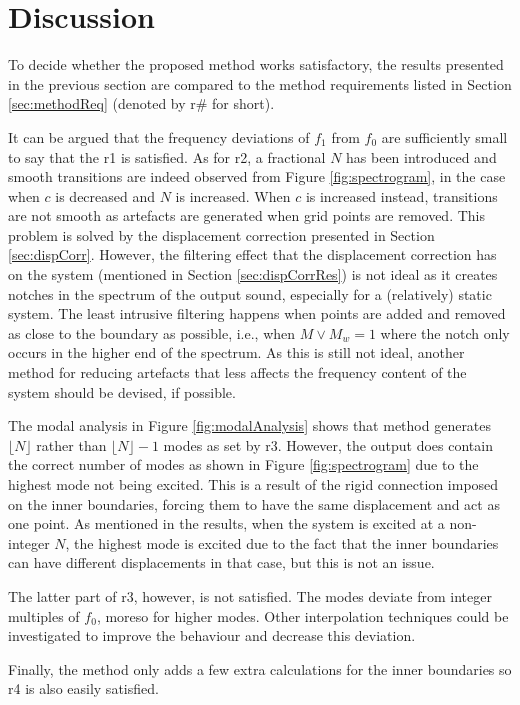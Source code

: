 \section{Discussion}
To decide whether the proposed method works satisfactory, the results presented in the previous section are compared to the method requirements listed in Section \eqref{sec:methodReq} (denoted by r\# for short). 

It can be argued that the frequency deviations of $f_1$ from $f_0$ are sufficiently small to say that the r1 is satisfied. As for r2, a fractional $N$ has been introduced and smooth transitions are indeed observed from Figure \ref{fig:spectrogram}, in the case when $c$ is decreased and $N$ is increased. When $c$ is increased instead, transitions are not smooth as artefacts are generated when grid points are removed. This problem is solved by the displacement correction presented in Section \ref{sec:dispCorr}. However, the filtering effect that the displacement correction has on the system (mentioned in Section \ref{sec:dispCorrRes}) is not ideal as it creates notches in the spectrum of the output sound, especially for a (relatively) static system. The least intrusive filtering happens when points are added and removed as close to the boundary as possible, i.e., when $M \vee M_w = 1$ where the notch only occurs in the higher end of the spectrum. As this is still not ideal, another method for reducing artefacts that less affects the frequency content of the system should be devised, if possible. 

The modal analysis in Figure \ref{fig:modalAnalysis} shows that method generates $\lfloor N\rfloor$ rather than $\lfloor N\rfloor - 1$ modes as set by r3. However, the output does contain the correct number of modes as shown in Figure \ref{fig:spectrogram} due to the highest mode not being excited. This is a result of the rigid connection imposed on the inner boundaries, forcing them to have the same displacement and act as one point. As mentioned in the results, when the system is excited at a non-integer $N$, the highest mode is excited due to the fact that the inner boundaries can have different displacements in that case, but this is not an issue.

The latter part of r3, however, is not satisfied. The modes deviate from integer multiples of $f_0$, moreso for higher modes. Other interpolation techniques could be investigated to improve the behaviour and decrease this deviation.

Finally, the method only adds a few extra calculations for the inner boundaries so r4 is also easily satisfied. 
\\

